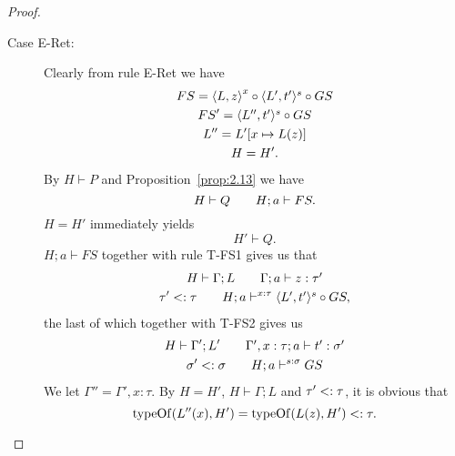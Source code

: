\begin{proof}
\begin{description}
\begin{description}
        \item[Case {\sc E-Ret}:] Clearly from rule {\sc E-Ret} we have
          \begin{equation}
            \begin{gathered}
              FS = \mbox{$\langle L, z \rangle$}^x \circ \mbox{$\langle L', t' \rangle^s$} \circ GS \\
              FS' = \mbox{$\langle L'', t' \rangle^s$} \circ GS \\
              L'' = L'[x \mapsto L(z)] \\
              H = H'.
            \end{gathered}
          \end{equation}
          By $H \vdash P$ and Proposition~\ref{prop:2.13} we have
          \begin{equation} \label{eq:eret-hp0}
            H \vdash Q \quad\quad H; a \vdash FS.
          \end{equation}
          $H = H'$ immediately yields
          \begin{equation}
            H' \vdash Q.
          \end{equation}
          $H; a \vdash FS$ together with rule {\sc T-FS1} gives us that
          \begin{equation}
            \begin{gathered}
              H \vdash \Gamma; L \quad\quad \mbox{$\Gamma;a\vdash z:\tau'$} \\
              \tau' <: \tau \quad\quad H; a \vdash^{x: \tau} \mbox{$\langle L', t' \rangle^s$} \circ GS,
            \end{gathered}
          \end{equation}
          the last of which together with {\sc T-FS2} gives us
          \begin{equation} \label{eq:eret-hp1}
            \begin{gathered}
              H \vdash \Gamma'; L' \quad\quad \mbox{$\Gamma', x:
              \tau;a\vdash t':\sigma'$} \\
              \sigma' <: \sigma \quad\quad H; a \vdash^{s: \sigma} GS
            \end{gathered}
          \end{equation}
          We let $\Gamma'' = \Gamma', x : \tau$. By $H = H'$, $H \vdash \Gamma;
          L$ and $\tau' <: \tau$, it is obvious that
          \begin{equation} \label{eq:eret-hp3}
            \mbox{$\mathrm{typeOf}$}(L''(x), H') = \mbox{$\mathrm{typeOf}$}(L(z), H') <: \tau.
          \end{equation}

\end{description}
\end{description}
\end{proof}
